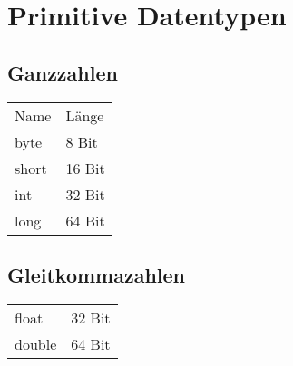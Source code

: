 



\section{Primitive Datentypen}

\subsection{Ganzzahlen}
\begin{tabular}{ll}
Name & Länge \\
byte & 8 Bit \\
short & 16 Bit \\
int & 32 Bit \\
long & 64 Bit
\end{tabular}

\subsection{Gleitkommazahlen}
\begin{tabular}{ll}
float & 32 Bit \\
double & 64 Bit
\end{tabular}